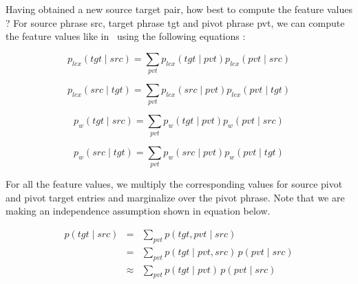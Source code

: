 Having obtained a new source target pair, how best to compute the feature values ? For source phrase src, target phrase tgt and pivot phrase pvt, we can compute the feature values like in~\cite{Utiyama:07} using the following equations : 

 		\begin{equation*}
                 p_{lex}(tgt \mid src) = \sum_{pvt} p_{lex}(tgt \mid pvt) p_{lex}(pvt \mid src)
        \end{equation*}

        \begin{equation*}
        	p_{lex}(src \mid tgt) = \sum_{pvt} p_{lex}(src \mid pvt) p_{lex}(pvt \mid tgt)
        \end{equation*}

         \begin{equation*}
        	p_w(tgt \mid src) = \sum_{pvt} p_w(tgt \mid pvt) p_w(pvt \mid src)
        \end{equation*}

        \begin{equation*}
        	p_w(src \mid tgt) = \sum_{pvt} p_w(src \mid pvt) p_w(pvt \mid tgt)
        \end{equation*}

        For all the feature values, we multiply the corresponding values for source pivot and pivot target entries and marginalize over the pivot phrase. Note that we are making an independence assumption shown in equation below. 

         \begin{eqnarray*} \label{eq:independence}
                p(tgt \mid src)&=&\sum_{pvt}{p(tgt, pvt \mid src)}\\
                &=& \sum_{pvt}{p(tgt \mid pvt, src)\,p(pvt \mid src)}\\
                &\approx& \sum_{pvt}{p(tgt \mid pvt)\,p(pvt \mid src)}
        \end{eqnarray*}


\newcommand{\maninexample}[1]{\emph{$\grave{a}$ $l\acute{a}$ $b\acute{a}\acute{a}r\acute{a}$ \textipa{\textltailn}$\acute{u}m\acute{a}$ $k\acute{o}s\acute{ɔ}n$}}

